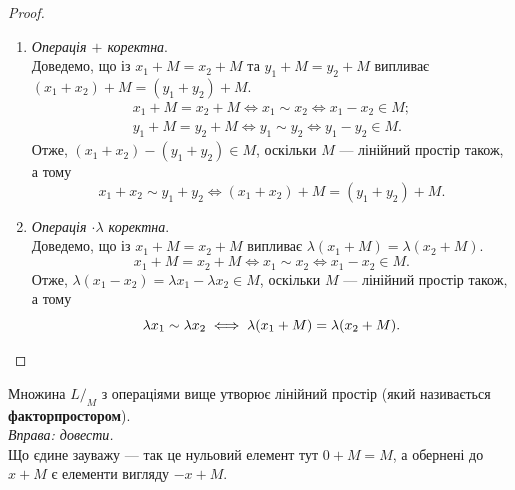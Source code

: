 \documentclass{math_library}
\begin{document}
	\begin{proof}
	\begin{enumerate}[wide=0pt,label={\Roman*.},topsep=0pt]
	\item \textit{Операція $+$ коректна}.\\
	Доведемо, що із $x_1+M=x_2+M$ та $y_1+M=y_2+M$ випливає $(x_1+x_2)+M=(y_1+y_2)+M$.
	\begin{align*}
	x_1+M=x_2+M \iff x_1 \sim x_2 \iff x_1 - x_2 \in M; \\
	y_1+M=y_2+M \iff y_1 \sim y_2 \iff y_1 - y_2 \in M.
	\end{align*}
	Отже, $(x_1+x_2)-(y_1+y_2) \in M$, оскільки $M$ --- лінійний простір також, а тому 
	\[
	x_1+x_2 \sim y_1+y_2 \iff (x_1+x_2)+M=(y_1+y_2)+M.
	\]
	\item \textit{Операція $\cdot \lambda$ коректна}.\\
	Доведемо, що із $x_1+M=x_2+M$ випливає $\lambda(x_1+M) = \lambda(x_2+M)$.
	\[
	x_1+M=x_2+M \iff x_1 \sim x_2 \iff x_1 - x_2 \in M.
	\]
	Отже, $\lambda(x_1-x_2) = \lambda x_1 - \lambda x_2 \in M$, оскільки $M$ --- лінійний простір також, а тому 
	\[
	\lambda x_1 \sim \lambda x_2 \iff \lambda(x_1+M) = \lambda(x_2+M). \qedhere
	\]
	\end{enumerate}
	\end{proof}
	
	\begin{theorem}
	Множина $L/_{M}$ з операціями вище утворює лінійний простір (який називається \textbf{факторпростором}).\\
	\textit{Вправа: довести.}
	\bigskip \\
	Що єдине зауважу --- так це нульовий елемент тут $0+M=M$, а обернені до $x+M$ є елементи вигляду $-x+M$.
	\end{theorem}
		
\end{document}
